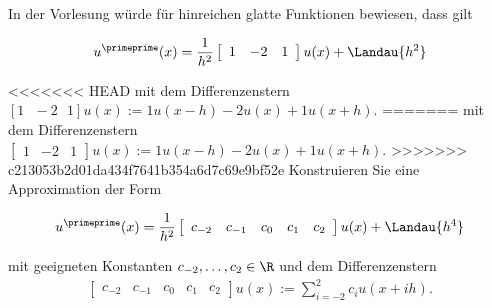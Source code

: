 \begin{exercise}
  In der Vorlesung würde für hinreichen glatte Funktionen bewiesen, dass gilt

  \begin{align*}
    u^\primeprime (x) = \frac{1}{h^2}\left[
    \begin{array}{ccc}
      1 & -2 & 1
    \end{array}
    \right] u(x) +
    \Landau{h^2}
  \end{align*}

<<<<<<< HEAD
  mit dem Differenzenstern $[1 \text{ }  -2 \text{ } 1]u(x):= 1u(x-h)-2u(x)+1u(x+h)$.
=======
  mit dem Differenzenstern $\left[
  \begin{array}{ccc}
    1 & -2 & 1
  \end{array}
  \right]u(x):= 1u(x-h)-2u(x)+1u(x+h)$.
>>>>>>> c213053b2d01da434f7641b354a6d7c69e9bf52e
  Konstruieren Sie eine Approximation der Form

  \begin{align*}
    u^\primeprime (x) = \frac{1}{h^2} \left[
    \begin{array}{ccccc}
    c_{-2} & c_{-1} & c_0 & c_1 & c_ 2
    \end{array}
    \right]
    u(x) + \Landau{h^4}
  \end{align*}

  mit geeigneten Konstanten $c_{-2}, \dots , c_2 \in \R$ und dem Differenzenstern
  \begin{align*}
    \left[
    \begin{array}{ccccc}
        c_{-2} & c_{-1} & c_0 & c_1 & c_ 2
    \end{array}
    \right]
    u(x)
    :=
    \sum_{i=-2}^2 c_i u(x+ih).
  \end{align*}
\end{exercise}

